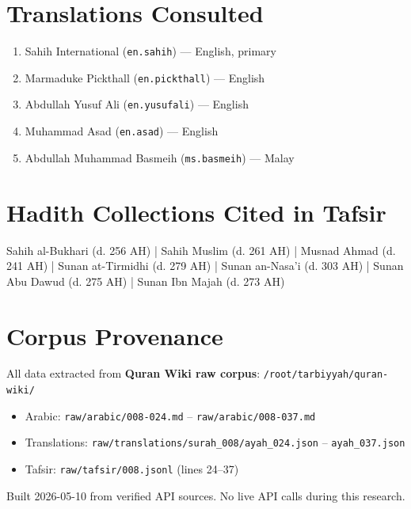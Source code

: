 \documentclass[11pt,a4paper,openany]{book}
\begin{document}
\section{Translations Consulted}
\begin{enumerate}
\item Sahih International (\texttt{en.sahih}) --- English, primary
\item Marmaduke Pickthall (\texttt{en.pickthall}) --- English
\item Abdullah Yusuf Ali (\texttt{en.yusufali}) --- English
\item Muhammad Asad (\texttt{en.asad}) --- English
\item Abdullah Muhammad Basmeih (\texttt{ms.basmeih}) --- Malay
\end{enumerate}

\section{Hadith Collections Cited in Tafsir}
Sahih al-Bukhari (d. 256 AH) | Sahih Muslim (d. 261 AH) | Musnad Ahmad (d. 241 AH) | Sunan at-Tirmidhi (d. 279 AH) | Sunan an-Nasa'i (d. 303 AH) | Sunan Abu Dawud (d. 275 AH) | Sunan Ibn Majah (d. 273 AH)

\section{Corpus Provenance}
All data extracted from \textbf{Quran Wiki raw corpus}: \texttt{/root/tarbiyyah/quran-wiki/}
\begin{itemize}
\item Arabic: \texttt{raw/arabic/008-024.md} -- \texttt{raw/arabic/008-037.md}
\item Translations: \texttt{raw/translations/surah\_008/ayah\_024.json} -- \texttt{ayah\_037.json}
\item Tafsir: \texttt{raw/tafsir/008.jsonl} (lines 24--37)
\end{itemize}
Built 2026-05-10 from verified API sources. No live API calls during this research.
\end{document}
